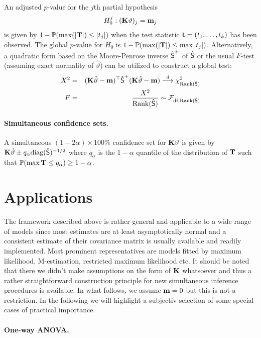 \documentclass[12pt]{article}
\begin{document}
An adjusted $p$-value for the $j$th partial hypothesis 
\begin{eqnarray*}
H_0^j: (\K \vartheta)_j = \m_j
\end{eqnarray*}
is given by $1 - \Prob(\max(|\T|) \le |t_j|)$ when the test statistic 
$\tt  = (t_1, \dots, t_k)$
has been observed. The global $p$-value for $H_0$ is $1 - \Prob(\max(|\T|) \le \max|t_j|)$.
Alternatively, a quadratic form based on the Moore-Penrose inverse $\hat{\S}^+$ of 
$\hat{\S}$ or the usual $F$-test (assuming exact normality of $\hat{\vartheta}$) 
can be utilized to construct a global test:
\begin{eqnarray*}
X^2 & = & (\K \hat{\vartheta} - \m)^\top \hat{\S}^+ (\K \hat{\vartheta} - \m) \cL \chi^2_{\Rg(\hat{\S})} \\
F & = &  \frac{X^2}{\Rg(\hat{\S})} \sim \F_{\text{df}, \Rg(\hat{\S})}
\end{eqnarray*}

\paragraph{Simultaneous confidence sets.}

A simultaneous $(1 - 2\alpha) \times 100\%$ 
confidence set for $\K \vartheta$ is given by 
$\K \hat{\vartheta} \pm q_\alpha \text{diag}(\hat{\S})^{-1/2}$
where $q_\alpha$ is the $1 - \alpha$ 
quantile of the distribution of $\T$ 
such that $\Prob(\max{\T} \le q_\alpha) \ge 1 - \alpha$.

\section{Applications}

The framework described above is rather general and applicable 
to a wide range of models since most estimates are at least asymptotically
normal and a consistent estimate of their covariance matrix
is usually available and readily implemented. Most prominent
representatives are models fitted by maximum likelihood, M-estimation,
restricted maximum likelihood etc. 
It should be noted that there we didn't make assumptions on the form
of $\K$ whatsoever and thus a rather straightforward construction 
principle for new simultaneous inference procedures is available. In
what follows, we assume $\m = 0$ but this is not a restriction.
In the following we will highlight a subjectiv selection of 
some special cases of practical importance.

\paragraph{One-way ANOVA.}
\end{document}

